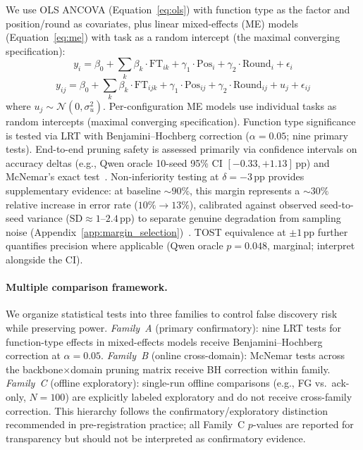 We use OLS ANCOVA (Equation~\ref{eq:ols}) with function type as the factor and position/round as covariates, plus linear mixed-effects (ME) models (Equation~\ref{eq:me}) with task as a random intercept (the maximal converging specification):
\begin{equation}
    y_i = \beta_0 + \textstyle\sum_{k} \beta_k \cdot \text{FT}_{ik} + \gamma_1 \cdot \text{Pos}_i + \gamma_2 \cdot \text{Round}_i + \epsilon_i
\label{eq:ols}
\end{equation}
\begin{equation}
    y_{ij} = \beta_0 + \textstyle\sum_{k} \beta_k \cdot \text{FT}_{ijk} + \gamma_1 \cdot \text{Pos}_{ij} + \gamma_2 \cdot \text{Round}_{ij} + u_j + \epsilon_{ij}
\label{eq:me}
\end{equation}
where $u_j \sim \mathcal{N}(0, \sigma^2_u)$. Per-configuration ME models use individual tasks as random intercepts (maximal converging specification). Function type significance is tested via LRT with Benjamini--Hochberg correction ($\alpha = 0.05$; nine primary tests). End-to-end pruning safety is assessed primarily via confidence intervals on accuracy deltas (e.g., Qwen oracle 10-seed 95\% CI $[-0.33, +1.13]$\,pp) and McNemar's exact test~\cite{mcnemar_1947}. Non-inferiority testing at $\delta = -3$\,pp provides supplementary evidence: at baseline ${\sim}90\%$, this margin represents a ${\sim}30\%$ relative increase in error rate ($10\% \to 13\%$), calibrated against observed seed-to-seed variance ($\text{SD} \approx 1$--$2.4$\,pp) to separate genuine degradation from sampling noise (Appendix~\ref{app:margin_selection})~\cite{lakens_equivalence_2017}. TOST equivalence at $\pm 1$\,pp further quantifies precision where applicable (Qwen oracle $p = 0.048$, marginal; interpret alongside the CI).

\paragraph{Multiple comparison framework.} We organize statistical tests into three families to control false discovery risk while preserving power. \emph{Family~A} (primary confirmatory): nine LRT tests for function-type effects in mixed-effects models receive Benjamini--Hochberg correction at $\alpha = 0.05$. \emph{Family~B} (online cross-domain): McNemar tests across the backbone$\times$domain pruning matrix receive BH correction within family. \emph{Family~C} (offline exploratory): single-run offline comparisons (e.g., FG vs.\ ack-only, $N{=}100$) are explicitly labeled exploratory and do not receive cross-family correction. This hierarchy follows the confirmatory/exploratory distinction recommended in pre-registration practice; all Family~C $p$-values are reported for transparency but should not be interpreted as confirmatory evidence.

